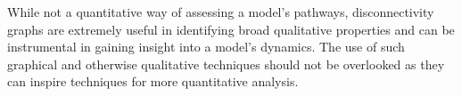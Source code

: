 
While not a quantitative way of assessing a model's pathways, disconnectivity graphs are extremely useful in identifying broad qualitative properties and can be instrumental in gaining insight into a model's dynamics. The use of such graphical and otherwise qualitative techniques should not be overlooked as they can inspire techniques for more quantitative analysis.  

